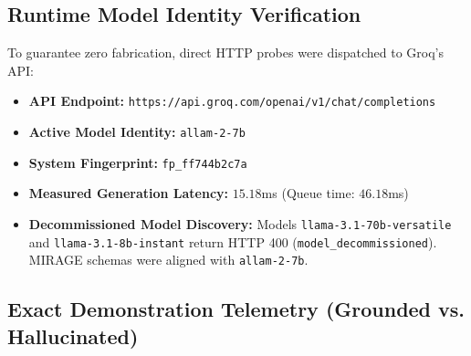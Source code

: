 \documentclass[11pt,a4paper]{article}
\begin{document}
\subsection{Runtime Model Identity Verification}
To guarantee zero fabrication, direct HTTP probes were dispatched to Groq's API:
\begin{itemize}[leftmargin=*]
    \item \textbf{API Endpoint:} \texttt{https://api.groq.com/openai/v1/chat/completions}
    \item \textbf{Active Model Identity:} \texttt{allam-2-7b}
    \item \textbf{System Fingerprint:} \texttt{fp\_ff744b2c7a}
    \item \textbf{Measured Generation Latency:} $15.18$ms (Queue time: $46.18$ms)
    \item \textbf{Decommissioned Model Discovery:} Models \texttt{llama-3.1-70b-versatile} and \texttt{llama-3.1-8b-instant} return HTTP 400 (\texttt{model\_decommissioned}). MIRAGE schemas were aligned with \texttt{allam-2-7b}.
\end{itemize}

\subsection{Exact Demonstration Telemetry (Grounded vs. Hallucinated)}
\end{document}
